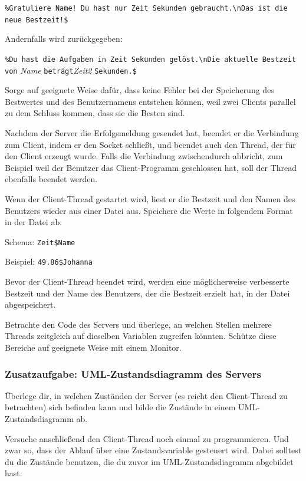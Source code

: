 \lstinline|%Gratuliere Name! Du hast nur Zeit Sekunden gebraucht.\nDas ist die neue Bestzeit!$|

Andernfalls wird zurückgegeben:

\lstinline|%Du hast die Aufgaben in Zeit Sekunden gelöst.\nDie aktuelle Bestzeit von| 
\emph{Name} \lstinline|beträgt|\linebreak \emph{Zeit2} \lstinline|Sekunden.$|

Sorge auf geeignete Weise dafür, dass keine Fehler bei der Speicherung des
Bestwertes und des Benutzernamens entstehen können, weil zwei Clients parallel
zu dem Schluss kommen, dass sie die Besten sind.

Nachdem der Server die Erfolgsmeldung gesendet hat, beendet er die Verbindung
zum Client, indem er den Socket schließt, und beendet auch den Thread, der für
den Client erzeugt wurde. Falls die Verbindung zwischendurch abbricht, zum
Beispiel weil der Benutzer das Client-Programm geschlossen hat, soll der Thread
ebenfalls beendet werden.

Wenn der Client-Thread gestartet wird, liest er die Bestzeit und den Namen des
Benutzers wieder aus einer Datei aus. Speichere die Werte in folgendem Format in
der Datei ab:

Schema: \lstinline|Zeit$Name|	

Beispiel: \lstinline|49.86$Johanna|

Bevor der Client-Thread beendet wird, werden eine möglicherweise verbesserte
Bestzeit und der Name des Benutzers, der die Bestzeit erzielt hat, in der Datei
abgespeichert.

Betrachte den Code des Servers und überlege, an welchen Stellen mehrere Threads
zeitgleich auf dieselben Variablen zugreifen könnten. Schütze diese Bereiche
auf geeignete Weise mit einem Monitor.

\subsubsection{Zusatzaufgabe: UML-Zustandsdiagramm des Servers}

Überlege dir, in welchen Zuständen der Server (es reicht den Client-Thread zu
betrachten) sich befinden kann und bilde die Zustände in einem
UML-Zustandsdiagramm ab.

Versuche anschließend den Client-Thread noch einmal zu programmieren. Und zwar
so, dass der Ablauf über eine Zustandsvariable gesteuert wird. Dabei solltest du
die Zustände benutzen, die du zuvor im UML-Zustandsdiagramm abgebildet hast.


